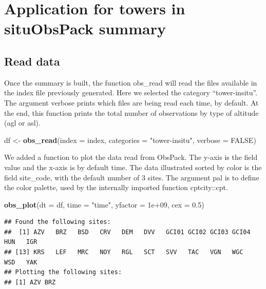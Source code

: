 \documentclass[preprint, 3p,
authoryear]{elsarticle} %
\newenvironment{Shaded}{\begin{snugshade}}{\end{snugshade}}
\newcommand{\AttributeTok}[1]{\textcolor[rgb]{0.13,0.29,0.53}{#1}}
\newcommand{\ConstantTok}[1]{\textcolor[rgb]{0.56,0.35,0.01}{#1}}
\newcommand{\FloatTok}[1]{\textcolor[rgb]{0.00,0.00,0.81}{#1}}
\newcommand{\FunctionTok}[1]{\textcolor[rgb]{0.13,0.29,0.53}{\textbf{#1}}}
\newcommand{\NormalTok}[1]{#1}
\newcommand{\OtherTok}[1]{\textcolor[rgb]{0.56,0.35,0.01}{#1}}
\newcommand{\StringTok}[1]{\textcolor[rgb]{0.31,0.60,0.02}{#1}}
\begin{document}
\hypertarget{application-for-towers-in-situobspack-summary}{%
\section{Application for towers in situObsPack
summary}\label{application-for-towers-in-situobspack-summary}}

\hypertarget{read-data}{%
\subsection{Read data}\label{read-data}}

Once the summary is built, the function obs\_read will read the files
available in the index file previously generated. Here we selected the
category ``tower-insitu''. The argument verbose prints which files are
being read each time, by default. At the end, this function prints the
total number of observations by type of altitude (agl or asl).

\begin{Shaded}
\begin{Highlighting}[]
\NormalTok{df }\OtherTok{\textless{}{-}} \FunctionTok{obs\_read}\NormalTok{(}\AttributeTok{index =}\NormalTok{ index,}
               \AttributeTok{categories =} \StringTok{"tower{-}insitu"}\NormalTok{,}
               \AttributeTok{verbose =} \ConstantTok{FALSE}\NormalTok{)}
\end{Highlighting}
\end{Shaded}

We added a function to plot the data read from ObsPack. The y-axis is
the field value and the x-axis is by default time. The data illustrated
sorted by color is the field site\_code, with the default number of 3
sites. The argument pal is to define the color palette, used by the
internally imported function cptcity::cpt.

\begin{Shaded}
\begin{Highlighting}[]
\FunctionTok{obs\_plot}\NormalTok{(}\AttributeTok{dt =}\NormalTok{ df, }\AttributeTok{time =} \StringTok{"time"}\NormalTok{, }\AttributeTok{yfactor =} \FloatTok{1e+09}\NormalTok{, }\AttributeTok{cex =} \FloatTok{0.5}\NormalTok{)}
\end{Highlighting}
\end{Shaded}

\begin{verbatim}
## Found the following sites: 
##  [1] AZV   BRZ   BSD   CRV   DEM   DVV   GCI01 GCI02 GCI03 GCI04 HUN   IGR  
## [13] KRS   LEF   MRC   NOY   RGL   SCT   SVV   TAC   VGN   WGC   WSD   YAK  
## Plotting the following sites: 
## [1] AZV BRZ
\end{verbatim}
\end{document}
